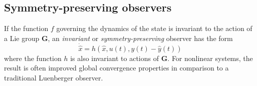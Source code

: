 \subsection{Symmetry-preserving observers}
If the function $f$ governing the dynamics of the state is invariant to the action of a Lie group $\mathbf{G}$, an \textit{invariant} or \textit{symmetry-preserving} observer has the form
\begin{equation}
	\dot{\hat{x}} = h(\hat{x},u(t),y(t)-\hat{y}(t))
\end{equation}
where the function $h$ is also invariant to actions of $\mathbf{G}$. For nonlinear systems, the result is often improved global convergence properties in comparison to a traditional Luenberger observer.

